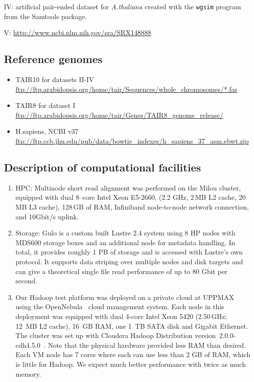 \documentclass[10pt]{article}
\begin{document}
IV: artificial pair-ended dataset for {\it A.thaliana} created with the {\tt wgsim} program from the Samtools package.

V: \url{http://www.ncbi.nlm.nih.gov/sra/SRX148888}


\subsection*{Reference genomes}
\begin{itemize}
\item TAIR10 for datasets II-IV \url{ftp://ftp.arabidopsis.org/home/tair/Sequences/whole\_chromosomes/*.fas}
\item TAIR8 for dataset I \url{ftp://ftp.arabidopsis.org/home/tair/Genes/TAIR8\_genome\_release/}
\item H.sapiens, NCBI v37 \url{ftp://ftp.ccb.jhu.edu/pub/data/bowtie\_indexes/h\_sapiens\_37\_asm.ebwt.zip}
\end{itemize}

\subsection*{Description of computational facilities}

\begin{enumerate}

\item 
HPC:
Multinode short read alignment was performed on the Milou cluster\cite{milouCluster}, equipped with dual 8--core Intel Xeon E5-2660, (2.2 GHz, 2\,MB L2 cache, 20\,MB L3 cache), 128\,GB of RAM, Infiniband node-to-node network connection, and 10Gbit/s uplink.

\item Storage: 
Gulo\cite{gulo} is a custom built Lustre 2.4 system using 8 HP nodes with MDS600 storage boxes and an additional node for metadata handling. In total, it provides roughly 1 PB of storage and is accessed with Lustre's own protocol. It supports data striping over multiple nodes and disk targets and can give a theoretical single file read performance of up to 80 Gbit per second.

\item Our Hadoop test platform was deployed on a private cloud at UPPMAX using the OpenNebula~\cite{opennebula} cloud management system. Each node in this deployment was equipped with dual 4-core Intel Xeon 5420 (2.50\,GHz; 12~MB L2 cache), 16~GB RAM, one 1~TB SATA disk and Gigabit Ethernet. The cluster was set up with Cloudera Hadoop Distribution version~2.0.0-cdh4.5.0~\cite{cloudera}.
Note that the physical hardware provided less RAM than desired. Each VM node has 7 cores where each can use less than 2 GB of RAM, which is little for Hadoop. We expect much better performance with twice as much memory.
\end{enumerate}
\end{document}
